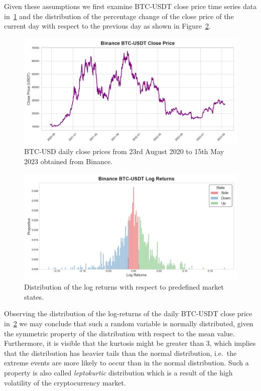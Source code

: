 Given these assumptions we first examine BTC-USDT close price time series data in~\ref{fig:BTC-USD} and the distribution of the percentage change of the close price of the current day with respect to the previous day as shown in Figure~\ref{fig:BTC-USD-distribution}.

\begin{figure}[htbp]
    \begin{center}
        \includegraphics[width=1.0\textwidth]{Figs/BTC-USD.png}
        \caption{BTC-USD daily close prices from 23rd August 2020 to 15th May 2023 obtained from Binance.~\citep{tradingview}}
        \label{fig:BTC-USD}
    \end{center}
\end{figure}

\begin{figure}[htbp]
    \begin{center}
        \includegraphics[width=1.0\textwidth]{Figs/BTC-USD_hist.png}
        \caption{Distribution of the log returns with respect to predefined market states.~\citep{tradingview}}
        \label{fig:BTC-USD-distribution}
    \end{center}
\end{figure}

Observing the distribution of the log-returns of the daily BTC-USDT close price in~\ref{fig:BTC-USD-distribution} we may conclude that such a random variable is normally distributed,
given the symmetric property of the distribution with respect to the mean value. Furthermore, it is visible that the kurtosis might be greater than 3,
which implies that the distribution has heavier tails than the normal distribution, i.e.\ the extreme events are more likely to occur than in the normal distribution.
Such a property is also called \textit{leptokurtic} distribution which is a result of the high volatility of the cryptocurrency market.~\citep{Peters1994}

